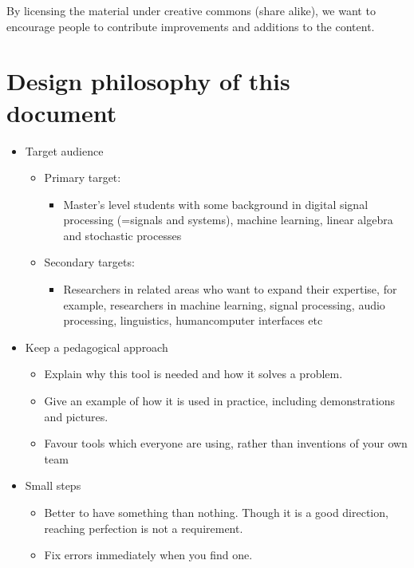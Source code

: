 \documentclass[letterpaper,10pt,english]{jupyterBook}
\begin{document}
\sphinxAtStartPar
By licensing the material under creative commons (share alike), we want
to encourage people to contribute improvements and additions to the
content.


\section{Design philosophy of this document}
\label{\detokenize{Preface:design-philosophy-of-this-document}}\begin{itemize}
\item {} 
\sphinxAtStartPar
Target audience
\begin{itemize}
\item {} 
\sphinxAtStartPar
Primary target:
\begin{itemize}
\item {} 
\sphinxAtStartPar
Master’s level students with some background in digital
signal processing (=signals and systems), machine learning,
linear algebra and stochastic processes

\end{itemize}

\item {} 
\sphinxAtStartPar
Secondary targets:
\begin{itemize}
\item {} 
\sphinxAtStartPar
Researchers in related areas who want to expand their
expertise, for example, researchers in machine learning,
signal processing, audio processing, linguistics,
human\sphinxhyphen{}computer interfaces etc

\end{itemize}

\end{itemize}

\item {} 
\sphinxAtStartPar
Keep a pedagogical approach
\begin{itemize}
\item {} 
\sphinxAtStartPar
Explain why this tool is needed and how it solves a problem.

\item {} 
\sphinxAtStartPar
Give an example of how it is used in practice, including
demonstrations and pictures.

\item {} 
\sphinxAtStartPar
Favour tools which everyone are using, rather than inventions of
your own team

\end{itemize}

\item {} 
\sphinxAtStartPar
Small steps
\begin{itemize}
\item {} 
\sphinxAtStartPar
Better to have something than nothing. Though it is a good
direction, reaching perfection is not a requirement.

\item {} 
\sphinxAtStartPar
Fix errors immediately when you find one.

\end{itemize}

\end{itemize}
\end{document}
